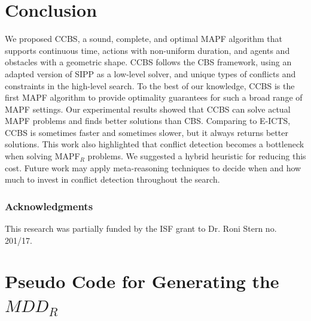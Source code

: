 \documentclass[review]{elsarticle}
\newcommand{\mddr}{\ensuremath{MDD_R}\xspace}
\newcommand{\ccbs}{\ac{CCBS}\xspace}
\newcommand{\cbs}{\ac{CBS}\xspace}
\newcommand{\sipp}{\ac{SIPP}\xspace}
\newcommand{\mapfr}{\ac{MAPF}$_R$\xspace}
\newcommand{\mapf}{\ac{MAPF}\xspace}
\begin{document}
\section{Conclusion}



We proposed \ccbs, a sound, complete, and optimal \mapf algorithm that supports continuous time, actions with non-uniform duration, and agents and obstacles with a geometric shape. 
\ccbs follows the \cbs framework, using an adapted version of \sipp as a low-level solver, and unique types of conflicts and constraints in the high-level search. 
To the best of our knowledge, \ccbs is the first \ac{MAPF} algorithm to provide optimality guarantees for such a broad range of \ac{MAPF} settings. 
Our experimental results showed that \ccbs can solve actual \ac{MAPF} problems and finds better solutions than \cbs. Comparing to E-ICTS, \ccbs is sometimes faster and sometimes slower, but it always returns better solutions.  
This work also highlighted that conflict detection becomes a bottleneck when solving \mapfr problems. We suggested a hybrid heuristic for reducing this cost. Future work may apply meta-reasoning techniques to decide when and how much to invest in conflict detection throughout the search. 











\subsubsection*{Acknowledgments}
This research was partially funded by the ISF grant to Dr. Roni Stern no. 201/17. 

\appendix

\section{Pseudo Code for Generating the \mddr}
\label{sec:code-mddr}
\end{document}
